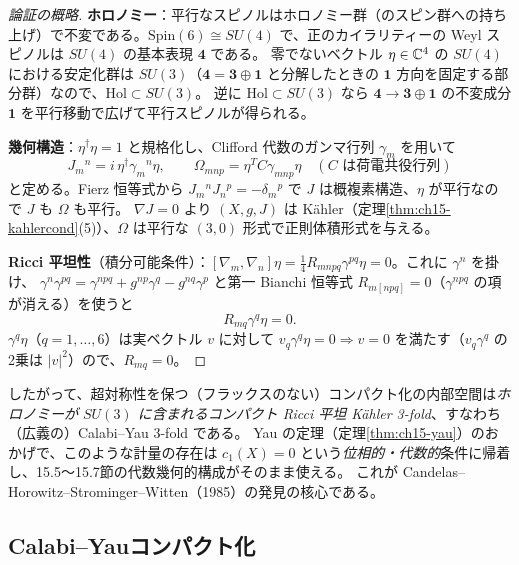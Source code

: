 \begin{proof}[論証の概略]
\textbf{ホロノミー}：平行なスピノルはホロノミー群（のスピン群への持ち上げ）で不変である。$\mathrm{Spin}(6)\cong SU(4)$ で、正のカイラリティーの Weyl スピノルは $SU(4)$ の基本表現 $\mathbf 4$ である。
零でないベクトル $\eta\in\mathbb{C}^4$ の $SU(4)$ における安定化群は $SU(3)$（$\mathbf 4 = \mathbf 3\oplus\mathbf 1$ と分解したときの $\mathbf 1$ 方向を固定する部分群）なので、$\mathrm{Hol}\subset SU(3)$。
逆に $\mathrm{Hol}\subset SU(3)$ なら $\mathbf 4\to\mathbf 3\oplus\mathbf1$ の不変成分 $\mathbf 1$ を平行移動で広げて平行スピノルが得られる。

\textbf{幾何構造}：$\eta^\dagger\eta = 1$ と規格化し、Clifford 代数のガンマ行列 $\gamma_m$ を用いて
\[
J_m{}^n = i\,\eta^\dagger\gamma_m{}^n\eta,\qquad \Omega_{mnp} = \eta^{T}C\gamma_{mnp}\eta\quad(C\text{ は荷電共役行列})
\]
と定める。Fierz 恒等式から $J_m{}^nJ_n{}^p = -\delta_m{}^p$ で $J$ は概複素構造、$\eta$ が平行なので $J$ も $\Omega$ も平行。
$\nabla J = 0$ より $(X,g,J)$ は K\"ahler（定理\ref{thm:ch15-kahlercond}(5)）、$\Omega$ は平行な $(3,0)$ 形式で正則体積形式を与える。

\textbf{Ricci 平坦性}（積分可能条件）：$[\nabla_m,\nabla_n]\eta = \frac14R_{mnpq}\gamma^{pq}\eta = 0$。これに $\gamma^n$ を掛け、
$\gamma^n\gamma^{pq} = \gamma^{npq}+g^{np}\gamma^q - g^{nq}\gamma^p$ と第一 Bianchi 恒等式 $R_{m[npq]} = 0$（$\gamma^{npq}$ の項が消える）を使うと
\[
R_{mq}\gamma^q\eta = 0 .
\]
$\gamma^q\eta$（$q=1,\dots,6$）は実ベクトル $v$ に対して $v_q\gamma^q\eta = 0\Rightarrow v = 0$ を満たす（$v_q\gamma^q$ の2乗は $|v|^2$）ので、$R_{mq} = 0$。
\end{proof}

したがって、超対称性を保つ（フラックスのない）コンパクト化の内部空間は\emph{ホロノミーが $SU(3)$ に含まれるコンパクト Ricci 平坦 K\"ahler 3-fold}、すなわち（広義の）Calabi--Yau 3-fold である。
Yau の定理（定理\ref{thm:ch15-yau}）のおかげで、このような計量の存在は $c_1(X) = 0$ という\emph{位相的・代数的}条件に帰着し、15.5〜15.7節の代数幾何的構成がそのまま使える。
これが Candelas--Horowitz--Strominger--Witten（1985）の発見の核心である。

\subsection{Calabi--Yauコンパクト化}

